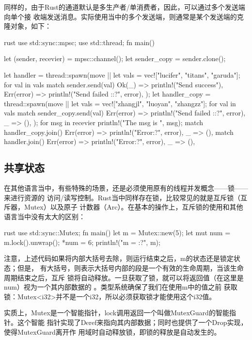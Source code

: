 同样的，由于Rust的通道默认是多生产者/单消费者，因此，可以通过多个发送端向单个接
收端发送消息。实际使用当中的多个发送端，则通常是某个发送端的克隆对象，如下：
\begin{code-block}{rust}
use std::sync::mpsc;
use std::thread;
fn main() {
    let (sender, recevier) = mpsc::channel();
    let sender_copy = sender.clone();

    let handler = thread::spawn(move || {
        let vals = vec!["lucifer", "titans", "garuda"];
        for val in vals {
            match sender.send(val) {
                Ok(_) => println!("Send success"),
                Err(error) => println!("Send failed :{:?}", error),
            }
        }
    });
    let handler_copy = thread::spawn(move || {
        let vals = vec!["zhangjl", "luoyan", "zhangzz"];
        for val in vals {
            match sender_copy.send(val) {
                Err(error) => println!("Send failed :{:?}", error),
                _ => (),
            }
        }
    });
    for msg in recevier {
        println!("The msg is {}", msg);
    }
    match handler_copy.join() {
        Err(error) => println!("Error{:?}", error),
        _ => (),
    }
    match handler.join() {
        Err(error) => println!("Error{:?}", error),
        _ => (),
    }
}
\end{code-block}

\subsection{共享状态}
在其他语言当中，有些特殊的场景，还是必须使用原有的线程并发概念——锁——来进行资源的
访问/读写控制。Rust当中同样存在锁，比较常见的就是互斥锁（互斥器，Mutex）以及原子
计数器（Arc）。在基本的操作上，互斥锁的使用和其他语言当中没有太大的区别：
\begin{code-block}{rust}
use std::sync::Mutex;
fn main() {
    let m = Mutex::new(5);
    {
        let mut num = m.lock().unwrap();
        *num = 6;
    }
    println!("m = {:?}", m);
}
\end{code-block}
注意，上述代码如果将内部大括号去除，则运行结束之后，m的状态还是锁定状态；但是，
有大括号，则表示大括号内部的段是一个有效的生命周期，当该生命周期结束之后，互斥
锁将自动释放。一旦获取了锁，就可以将返回值（在这里是num）视为一个其内部数据的
。类型系统确保了我们在使用m中的值之前
获取锁：Mutex<i32>并不是一个i32，所以必须获取锁才能使用这个i32值。

实质上，Mutex是一个智能指针，lock调用返回一个叫做MutexGuard的智能指针。这个智能
指针实现了Deref来指向其内部数据；同时也提供了一个Drop实现，使得MutexGuard离开作
用域时自动释放锁，即锁的释放是自动发生的。


